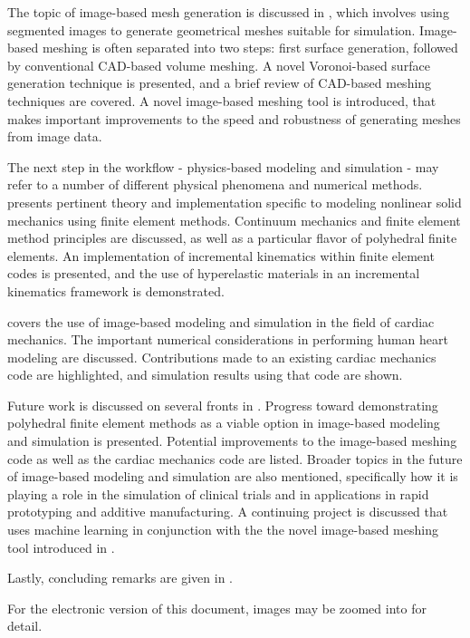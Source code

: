 The topic of image-based mesh generation is discussed in , which involves using segmented images to generate  geometrical meshes suitable for simulation. Image-based meshing is often separated into two steps: first surface generation,  followed by conventional CAD-based volume meshing. A novel Voronoi-based surface generation technique is presented, and a brief review of CAD-based meshing techniques are covered. A novel image-based meshing tool is introduced, that makes important improvements to the speed and robustness of generating meshes from image data.

The next step in the workflow - physics-based modeling and simulation - may refer to a number of different physical phenomena and numerical methods.  presents pertinent theory and implementation specific to modeling nonlinear solid mechanics using finite element methods. Continuum mechanics and finite element method principles are discussed, as well as a particular flavor of polyhedral finite elements. An implementation of incremental kinematics within finite element codes is presented, and the use of hyperelastic materials in an incremental kinematics framework is demonstrated.

 covers the use of image-based modeling and simulation in the field of cardiac mechanics. The important numerical considerations in performing human heart modeling are discussed. Contributions made to an existing cardiac mechanics code are highlighted, and simulation results using that code are shown. 

Future work is discussed on several fronts in . Progress toward demonstrating polyhedral finite element methods as a viable option in image-based modeling and simulation is presented. Potential improvements to the image-based meshing code as well as the cardiac mechanics code are listed. Broader topics in the future of image-based modeling and simulation are also mentioned, specifically how it is playing a role in the simulation of clinical trials and in applications in rapid prototyping and additive manufacturing. A continuing project is discussed that uses machine learning in conjunction with the the novel image-based meshing tool introduced in .

Lastly, concluding remarks are given in .

For the electronic version of this document, images may be zoomed into for detail.
